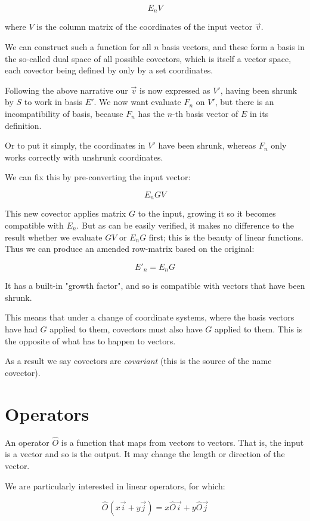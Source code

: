 $$E_nV$$

where $V$ is the column matrix of the coordinates of the input vector $\vec{v}$.

We can construct such a function for all $n$ basis vectors, and these form a basis in the so-called dual space of all possible covectors, which is itself a vector space, each covector being defined by only by a set coordinates.

Following the above narrative our $\vec{v}$ is now expressed as $V'$, having been shrunk by $S$ to work in basis $E'$. We now want evaluate $F_n$ on $V'$, but there is an incompatibility of basis, because $F_n$ has the $n$-th basis vector of $E$ in its definition.

Or to put it simply, the coordinates in $V'$ have been shrunk, whereas $F_n$ only works correctly with unshrunk coordinates.

We can fix this by pre-converting the input vector:

$$E_nGV$$

This new covector applies matrix $G$ to the input, growing it so it becomes compatible with $E_n$. But as can be easily verified, it makes no difference to the result whether we evaluate $GV$ or $E_nG$ first; this is the beauty of linear functions. Thus we can produce an amended row-matrix based on the original:

$$E'_n = E_nG$$

It has a built-in "growth factor", and so is compatible with vectors that have been shrunk.

This means that under a change of coordinate systems, where the basis vectors have had $G$ applied to them, covectors must also have $G$ applied to them. This is the opposite of what has to happen to vectors.

As a result we say covectors are \textit{covariant} (this is the source of the name covector).

\section{Operators}

An operator $\hat{O}$ is a function that maps from vectors to vectors. That is, the input is a vector and so is the output. It may change the length or direction of the vector.

We are particularly interested in linear operators, for which:

$$\hat{O}(x\vec{i} + y\vec{j}) = x\hat{O}\vec{i} + y\hat{O}\vec{j}$$

